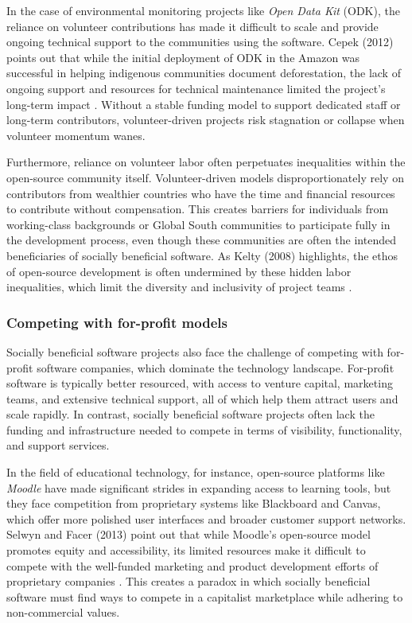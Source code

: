 \begin{refsection}
In the case of environmental monitoring projects like \textit{Open Data Kit} (ODK), the reliance on volunteer contributions has made it difficult to scale and provide ongoing technical support to the communities using the software. Cepek (2012) points out that while the initial deployment of ODK in the Amazon was successful in helping indigenous communities document deforestation, the lack of ongoing support and resources for technical maintenance limited the project’s long-term impact \cite[pp.~57-60]{cepek2012}. Without a stable funding model to support dedicated staff or long-term contributors, volunteer-driven projects risk stagnation or collapse when volunteer momentum wanes.

Furthermore, reliance on volunteer labor often perpetuates inequalities within the open-source community itself. Volunteer-driven models disproportionately rely on contributors from wealthier countries who have the time and financial resources to contribute without compensation. This creates barriers for individuals from working-class backgrounds or Global South communities to participate fully in the development process, even though these communities are often the intended beneficiaries of socially beneficial software. As Kelty (2008) highlights, the ethos of open-source development is often undermined by these hidden labor inequalities, which limit the diversity and inclusivity of project teams \cite[pp.~106-108]{kelty2008}.

\subsubsection{Competing with for-profit models}

Socially beneficial software projects also face the challenge of competing with for-profit software companies, which dominate the technology landscape. For-profit software is typically better resourced, with access to venture capital, marketing teams, and extensive technical support, all of which help them attract users and scale rapidly. In contrast, socially beneficial software projects often lack the funding and infrastructure needed to compete in terms of visibility, functionality, and support services.

In the field of educational technology, for instance, open-source platforms like \textit{Moodle} have made significant strides in expanding access to learning tools, but they face competition from proprietary systems like Blackboard and Canvas, which offer more polished user interfaces and broader customer support networks. Selwyn and Facer (2013) point out that while Moodle’s open-source model promotes equity and accessibility, its limited resources make it difficult to compete with the well-funded marketing and product development efforts of proprietary companies \cite[pp.~103-105]{selwyn2013}. This creates a paradox in which socially beneficial software must find ways to compete in a capitalist marketplace while adhering to non-commercial values.


\end{refsection}
